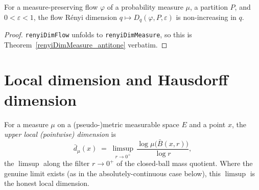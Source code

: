 \begin{corollary}\label{renyiDimFlow_antitone}
  \leanok
  For a measure-preserving flow \(\varphi\) of a probability measure \(\mu\), a partition \(P\),
  and \(0 < \varepsilon < 1\), the flow R\'enyi dimension \(q \mapsto D_q(\varphi, P,
  \varepsilon)\) is non-increasing in \(q\).
\end{corollary}
\begin{proof}\leanok
  \texttt{renyiDimFlow} unfolds to \texttt{renyiDimMeasure}, so this is
  Theorem~\ref{renyiDimMeasure_antitone} verbatim.
\end{proof}

\section{Local dimension and Hausdorff dimension}

\begin{definition}\label{localDimension}
  \leanok
  For a measure \(\mu\) on a (pseudo-)metric measurable space \(E\) and a point \(x\), the
  \emph{upper local (pointwise) dimension} is
  \[
    \bar d_\mu(x) \;=\; \limsup_{r \to 0^+}\,
      \frac{\log \mu\bigl(\bar B(x,r)\bigr)}{\log r},
  \]
  the \(\limsup\) along the filter \(r \to 0^+\) of the closed-ball mass quotient. Where the
  genuine limit exists (as in the absolutely-continuous case below), this \(\limsup\) is the
  honest local dimension.
\end{definition}

